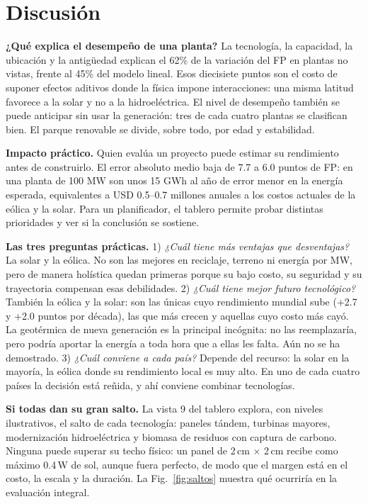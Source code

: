 \documentclass[journal,letterpaper]{IEEEtran}
\begin{document}
\section{Discusión}
\textbf{¿Qué explica el desempeño de una planta?} La tecnología, la capacidad, la ubicación y la antigüedad explican el 62\% de la variación del FP en plantas no vistas, frente al 45\% del modelo lineal. Esos diecisiete puntos son el costo de suponer efectos aditivos donde la física impone interacciones: una misma latitud favorece a la solar y no a la hidroeléctrica. El nivel de desempeño también se puede anticipar sin usar la generación: tres de cada cuatro plantas se clasifican bien. El parque renovable se divide, sobre todo, por edad y estabilidad.

\textbf{Impacto práctico.} Quien evalúa un proyecto puede estimar su rendimiento antes de construirlo. El error absoluto medio baja de 7.7 a 6.0 puntos de FP: en una planta de 100 MW son unos 15 GWh al año de error menor en la energía esperada, equivalentes a USD 0.5--0.7 millones anuales a los costos actuales de la eólica y la solar. Para un planificador, el tablero permite probar distintas prioridades y ver si la conclusión se sostiene.

\textbf{Las tres preguntas prácticas.} 1) \emph{¿Cuál tiene más ventajas que desventajas?} La solar y la eólica. No son las mejores en reciclaje, terreno ni energía por MW, pero de manera holística quedan primeras porque su bajo costo, su seguridad y su trayectoria compensan esas debilidades. 2) \emph{¿Cuál tiene mejor futuro tecnológico?} También la eólica y la solar: son las únicas cuyo rendimiento mundial sube (+2.7 y +2.0 puntos por década), las que más crecen y aquellas cuyo costo más cayó. La geotérmica de nueva generación es la principal incógnita: no las reemplazaría, pero podría aportar la energía a toda hora que a ellas les falta. Aún no se ha demostrado. 3) \emph{¿Cuál conviene a cada país?} Depende del recurso: la solar en la mayoría, la eólica donde su rendimiento local es muy alto. En uno de cada cuatro países la decisión está reñida, y ahí conviene combinar tecnologías.

\textbf{Si todas dan su gran salto.} La vista 9 del tablero explora, con niveles ilustrativos, el salto de cada tecnología: paneles tándem, turbinas mayores, modernización hidroeléctrica y biomasa de residuos con captura de carbono. Ninguna puede superar su techo físico: un panel de 2\,cm $\times$ 2\,cm recibe como máximo 0.4\,W de sol, aunque fuera perfecto, de modo que el margen está en el costo, la escala y la duración. La Fig.~\ref{fig:saltos} muestra qué ocurriría en la evaluación integral.
\end{document}

